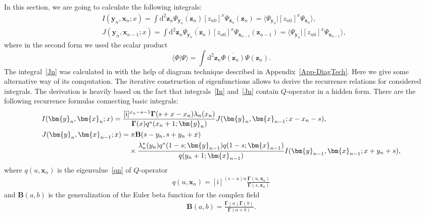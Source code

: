 \documentclass[pdftex]{sigma}
\renewcommand{\imath}{\mathrm{i}}
\numberwithin{equation}{section}
\begin{document}
In this section, we are going to calculate the following integrals:
\begin{align}
& \label{In}
I(\bm{y}_n,\bm{x}_{n};x) =
\int \mathrm{d}^{2}\bm{z}_n
\overline{\Psi_{\bm{y}_n}(\bm{z}_n)}
[z_{n0}]^{x}
\Psi_{\bm{x}_{n}}(\bm{z}_n) =
\langle\Psi_{\bm{y}_n}|[z_{n0}]^{x} \Psi_{\bm{x}_{n}}\rangle ,\\
& \label{Jn}
J(\bm{y}_n,\bm{x}_{n-1};x) =
\int \mathrm{d}^{2}\bm{z}_n
\overline{\Psi_{\bm{y}_n}(\bm{z}_n)}
[z_{n0}]^{x}
\Psi_{\bm{x}_{n-1}}(\bm{z}_{n-1}) =
\langle\Psi_{\bm{y}_n}|[z_{n0}]^{x} \Psi_{\bm{x}_{n-1}}\rangle ,
\end{align}
where in the second form we used the scalar product
\begin{equation*}
	\langle\Phi|\Psi\rangle =
	\int \mathrm{d}^{2}\bm{z}_n \overline{\Phi(\bm{z}_n)} \Psi(\bm{z}_n) .
\end{equation*}
The integral~\eqref{Jn} was calculated in \cite{Val20} with the help of diagram technique described in Appendix~\ref{App-DiagTech}.
Here we give some alternative way of its computation.
The iterative construction of eigenfunctions allows to derive the recurrence
relations for considered integrals. The derivation is heavily based on the fact that integrals~\eqref{In} and~\eqref{Jn} contain $Q$-operator in a hidden form. There are the following recurrence formulas connecting basic integrals:
\begin{align}
\label{In1}
&I(\bm{y}_n,\bm{x}_{n};x) = \frac{[\imath]^{x_n-s-1} \mathbf{\Gamma}(s+x-x_n) \lambda_n(x_n)}
{\mathbf{\Gamma}(x) q^*(x_n+1;\bm{y}_n)}
J(\bm{y}_n,\bm{x}_{n-1};x-x_n-s) ,\\
& \nonumber
J(\bm{y}_n,\bm{x}_{n-1};x) = \pi \mathbf{B}(s-y_n,s+y_n+x) \\
& \label{Jn1}
\hphantom{J(\bm{y}_n,\bm{x}_{n-1};x) =}{}
\times\frac{\lambda_n^\ast(y_n) q^{*}(1-s;\bm{y}_{n-1}) q(1-s;\bm{x}_{n-1})}
{q(y_{n}+1;\bm{x}_{n-1})}
 I(\bm{y}_{n-1},\bm{x}_{n-1};x+y_{n}+s) ,
\end{align}
where $q(u ,\bm x_{n})$ is the eigenvalue~\eqref{qn} of $Q$-operator
\begin{align*}
q(u ,\bm x_{n}) = [\imath]^{(s-u)n}
\frac{\mathbf{\Gamma}(u ,\bm{x}_n)}{\mathbf{\Gamma}(s ,\bm{x}_n)}
\end{align*}
and $\mathbf{B}(a,b)$ is the generalization of the Euler beta function for the complex field~\cite{GGR,N}
\begin{align*}
\mathbf{B}(a,b) =
\frac{\mathbf{\Gamma}(a) \mathbf{\Gamma}(b)}{\mathbf{\Gamma}(a+b)} .
\end{align*}
\end{document}

